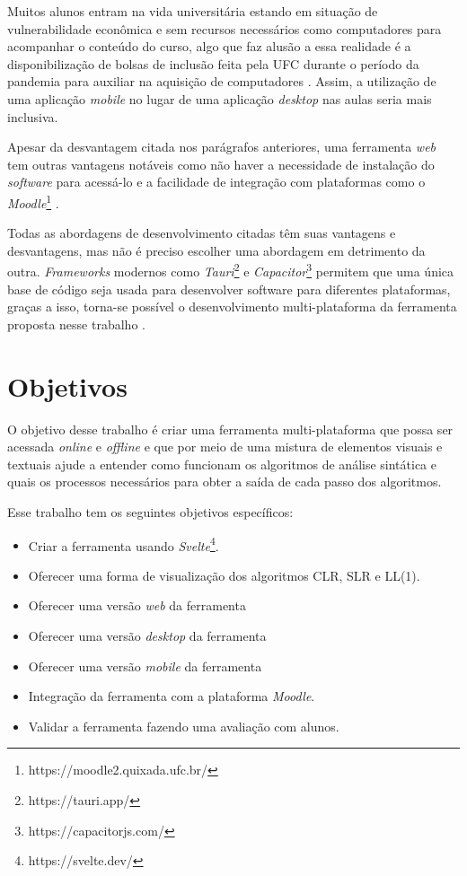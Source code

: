 Muitos alunos entram na vida universitária estando em situação de vulnerabilidade econômica e sem recursos necessários como computadores para acompanhar o conteúdo do curso, algo que faz alusão a essa realidade é a disponibilização de bolsas de inclusão feita pela UFC durante o período da pandemia para auxiliar na aquisição de computadores \cite{povo_ufc_2020}. Assim, a utilização de uma aplicação \textit{mobile} no lugar de uma aplicação \textit{desktop} nas aulas seria mais inclusiva.

Apesar da desvantagem citada nos parágrafos anteriores, uma ferramenta \textit{web} tem outras vantagens notáveis como não haver a necessidade de instalação do \textit{software} para acessá-lo e a facilidade de integração com plataformas como o \textit{Moodle}\footnote{https://moodle2.quixada.ufc.br/} \cite{desai_web_2022}.

Todas as abordagens de desenvolvimento citadas têm suas vantagens e desvantagens, mas não é preciso  escolher uma abordagem em detrimento da outra. \textit{Frameworks} modernos como \textit{Tauri}\footnote{https://tauri.app/} e \textit{Capacitor}\footnote{https://capacitorjs.com/} permitem que uma única base de código seja usada para desenvolver software para diferentes plataformas, graças a isso, torna-se possível o desenvolvimento multi-plataforma da ferramenta proposta nesse trabalho \cite{shevtsiv2021cross}.

\section{Objetivos}
O objetivo desse trabalho é criar uma ferramenta multi-plataforma que possa ser acessada \textit{online} e \textit{offline}  e que por meio de uma mistura de elementos visuais e textuais ajude a entender como funcionam os algoritmos de análise sintática e quais os processos necessários para obter a saída de cada passo dos algoritmos.

Esse trabalho tem os seguintes objetivos específicos:
\begin{itemize}[label=$\sbullet$]
    \item Criar a ferramenta usando \textit{Svelte}\footnote{https://svelte.dev/}.
    \item Oferecer uma forma de visualização dos algoritmos CLR, SLR e LL(1).
    \item Oferecer uma versão \textit{web} da ferramenta
    \item Oferecer uma versão \textit{desktop} da ferramenta
    \item Oferecer uma versão \textit{mobile} da ferramenta
    \item Integração da ferramenta com a plataforma \textit{Moodle}.
    \item Validar a ferramenta fazendo uma avaliação com alunos.
\end{itemize}

